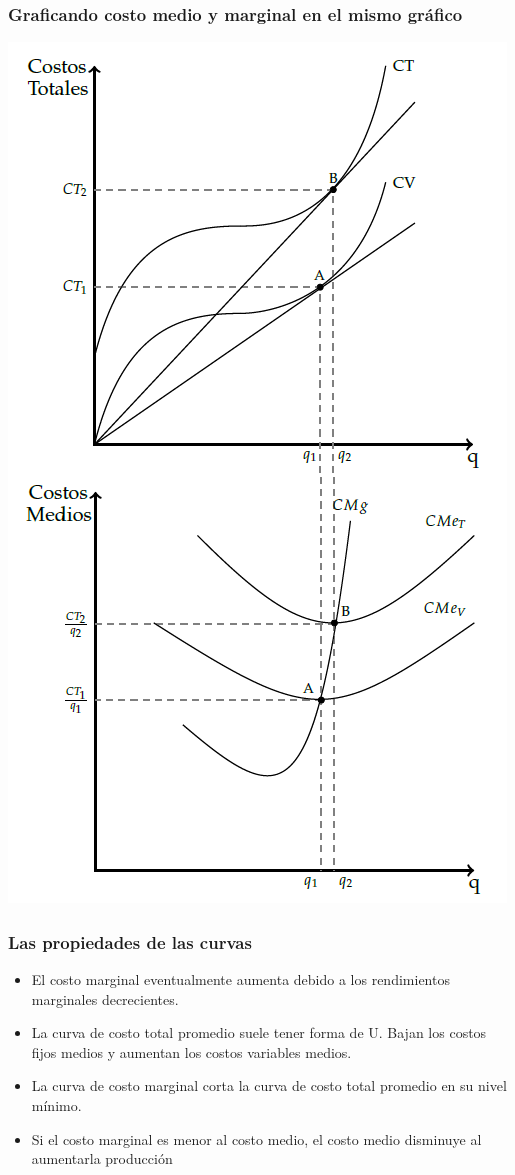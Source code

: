 \documentclass{beamer}
\begin{document}
\begin{frame}
\frametitle{Graficando costo medio y marginal en el mismo gráfico}
\centering
\includegraphics[scale=0.9]{../Figures/Costoscp.png}
\end{frame}

\begin{frame}
\frametitle{Las propiedades de las curvas}
\begin{itemize}
    \item El costo marginal eventualmente aumenta debido a los rendimientos marginales decrecientes.
    \item La curva de costo total promedio suele tener forma de U. Bajan los costos fijos medios y aumentan los costos variables medios.
    \item La curva de costo marginal corta la curva de costo total promedio en su nivel mínimo.
    \item Si el costo marginal es menor al costo medio, el costo medio disminuye al aumentarla producción
\end{itemize}
\end{frame}
\end{document}
